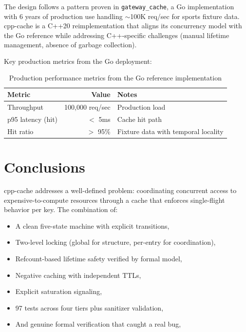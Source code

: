 \documentclass[11pt,a4paper]{article}
\begin{document}
The design follows a pattern proven in \texttt{gateway\_cache}, a Go
implementation with 6 years of production use handling $\sim$100K
req/sec for sports fixture data.  cpp-cache is a C++20 reimplementation
that aligns its concurrency model with the Go reference while addressing
C++-specific challenges (manual lifetime management, absence of garbage
collection).

Key production metrics from the Go deployment:

\begin{table}[htbp]
\centering
\begin{tabular}{@{}lrl@{}}
\toprule
Metric & Value & Notes \\
\midrule
Throughput & 100,000 req/sec & Production load \\
p95 latency (hit) & $<$ 5ms & Cache hit path \\
Hit ratio & $>$ 95\% & Fixture data with temporal locality \\
\bottomrule
\end{tabular}
\caption{Production performance metrics from the Go reference implementation}
\end{table}

\section{Conclusions}

cpp-cache addresses a well-defined problem: coordinating concurrent
access to expensive-to-compute resources through a cache that enforces
single-flight behavior per key.  The combination of:

\begin{itemize}
\item A clean five-state machine with explicit transitions,
\item Two-level locking (global for structure, per-entry for coordination),
\item Refcount-based lifetime safety verified by formal model,
\item Negative caching with independent TTLs,
\item Explicit saturation signaling,
\item 97 tests across four tiers plus sanitizer validation,
\item And genuine formal verification that caught a real bug,
\end{itemize}
\end{document}
